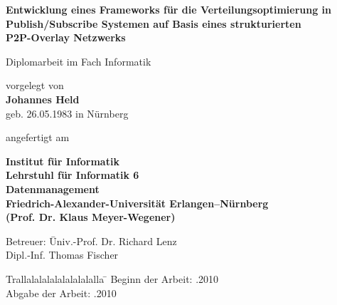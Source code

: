 \begin{titlepage}
  
  \begin{center}
    
    {\Huge \bf
Entwicklung eines Frameworks für die Verteilungsoptimierung in Publish/Subscribe Systemen auf Basis eines strukturierten\\[0.4cm] P2P-Overlay Netzwerks} 
    
    \vspace*{1cm}
    Diplomarbeit im Fach Informatik
    \vspace{2cm}
    
    {\large vorgelegt von} \\
    \vspace*{0.7cm}
    {\Large \bf Johannes Held} \\
    \vspace*{0.7cm}
    {\large geb. 26.05.1983 in Nürnberg} 
    
    \vspace{1cm}
    
    angefertigt am 

    \vspace{1cm}
    
    {\bf 
      Institut für Informatik \\
      Lehrstuhl für Informatik 6\\
      Datenmanagement \\
      Friedrich-Alexander-Universität Erlangen--Nürnberg \\
      (Prof. Dr. Klaus Meyer-Wegener)
      }
    
    \vspace{1cm}
\end{center}
\begin{tabbing}
    Betreuer: \= Univ.-Prof. Dr. Richard Lenz \\
    \> Dipl.-Inf. Thomas Fischer 
\end{tabbing}
    \vspace{1cm}
    
    
\begin{tabbing}
	Trallalalalalalalalalalla \= \kill
	Beginn der Arbeit:   .2010 \\
  Abgabe der Arbeit:   .2010
\end{tabbing}
    
  
\end{titlepage}

\clearpage{\pagestyle{empty}\cleardoublepage}
